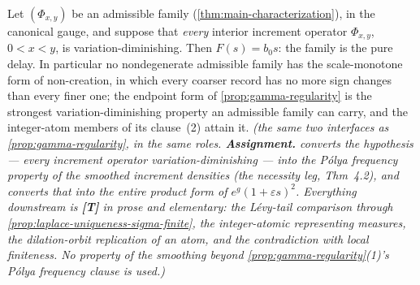 \begin{proposition}\label{prop:vd-impossibility}
Let $(\Phi_{x,y})$ be an admissible family (\ref{thm:main-characterization}), in
the canonical gauge, and suppose that \emph{every} interior increment operator
$\Phi_{x,y}$, $0 < x < y$, is variation-diminishing. Then $F(s) = b_0 s$: the family is
the pure delay. In particular no nondegenerate admissible family has the scale-monotone
form of non-creation, in which every coarser record has no more sign changes than every
finer one; the endpoint form of \ref{prop:gamma-regularity} is the strongest
variation-diminishing property an admissible family can carry, and the integer-atom
members of its clause~(2) attain it.
\statusA\quad{}\quad{}\quad\emph{(the same two interfaces as
\ref{prop:gamma-regularity}, in the same roles.
\textbf{Assignment.}  converts the hypothesis --- every increment operator
variation-diminishing --- into the P\'olya frequency property of the smoothed increment
densities (the necessity leg, Thm~4.2), and  converts that into the entire
product form of $e^{g}(1+\varepsilon s)^{2}$. Everything downstream is \textbf{[T]} in
prose and elementary: the L\'evy-tail comparison through
\ref{prop:laplace-uniqueness-sigma-finite}, the integer-atomic representing measures, the
dilation-orbit replication of an atom, and the contradiction with local finiteness. No
property of the smoothing beyond \ref{prop:gamma-regularity}(1)'s P\'olya frequency clause
is used.)}
\end{proposition}

